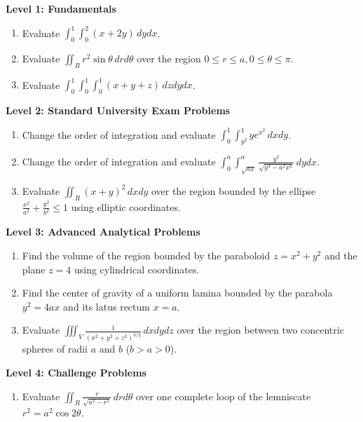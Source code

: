 \begin{practiceset}
\noindent\textbf{Level 1: Fundamentals}
\begin{enumerate}[leftmargin=1.5em]
    \item Evaluate $\int_0^1 \int_0^2 (x + 2y)\,dy dx$.
    \item Evaluate $\iint_R r^2 \sin\theta\,dr d\theta$ over the region $0 \le r \le a, 0 \le \theta \le \pi$.
    \item Evaluate $\int_0^1 \int_0^1 \int_0^1 (x + y + z)\,dz dy dx$.
\end{enumerate}

\medskip
\noindent\textbf{Level 2: Standard University Exam Problems}
\begin{enumerate}[leftmargin=1.5em, start=4]
    \item Change the order of integration and evaluate $\int_0^1 \int_{y^2}^1 y e^{x^2}\,dx dy$.
    \item Change the order of integration and evaluate $\int_0^a \int_{\sqrt{ax}}^a \frac{y^2}{\sqrt{y^4 - a^2 x^2}}\,dy dx$.
    \item Evaluate $\iint_R (x+y)^2\,dx dy$ over the region bounded by the ellipse $\frac{x^2}{a^2} + \frac{y^2}{b^2} \le 1$ using elliptic coordinates.
\end{enumerate}

\medskip
\noindent\textbf{Level 3: Advanced Analytical Problems}
\begin{enumerate}[leftmargin=1.5em, start=7]
    \item Find the volume of the region bounded by the paraboloid $z = x^2 + y^2$ and the plane $z = 4$ using cylindrical coordinates.
    \item Find the center of gravity of a uniform lamina bounded by the parabola $y^2 = 4ax$ and its latus rectum $x = a$.
    \item Evaluate $\iiint_V \frac{1}{(x^2+y^2+z^2)^{3/2}}\,dx dy dz$ over the region between two concentric spheres of radii $a$ and $b$ ($b > a > 0$).
\end{enumerate}

\medskip
\noindent\textbf{Level 4: Challenge Problems}
\begin{enumerate}[leftmargin=1.5em, start=10]
    \item Evaluate $\iint_R \frac{r}{\sqrt{a^2 - r^2}}\,dr d\theta$ over one complete loop of the lemniscate $r^2 = a^2 \cos 2\theta$.
\end{enumerate}
\end{practiceset}


